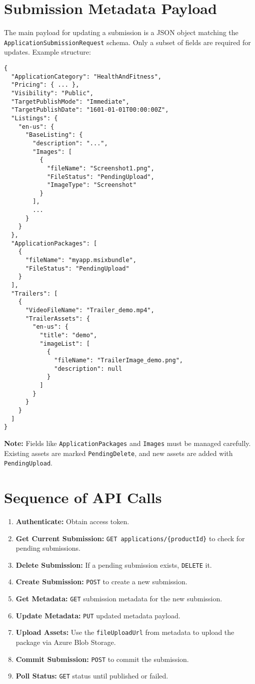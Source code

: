\documentclass{article}
\begin{document}
\section{Submission Metadata Payload}
The main payload for updating a submission is a JSON object matching the \texttt{ApplicationSubmissionRequest} schema. Only a subset of fields are required for updates. Example structure:
\begin{verbatim}
{
  "ApplicationCategory": "HealthAndFitness",
  "Pricing": { ... },
  "Visibility": "Public",
  "TargetPublishMode": "Immediate",
  "TargetPublishDate": "1601-01-01T00:00:00Z",
  "Listings": {
    "en-us": {
      "BaseListing": {
        "description": "...",
        "Images": [
          {
            "fileName": "Screenshot1.png",
            "FileStatus": "PendingUpload",
            "ImageType": "Screenshot"
          }
        ],
        ...
      }
    }
  },
  "ApplicationPackages": [
    {
      "fileName": "myapp.msixbundle",
      "FileStatus": "PendingUpload"
    }
  ],
  "Trailers": [
    {
      "VideoFileName": "Trailer_demo.mp4",
      "TrailerAssets": {
        "en-us": {
          "title": "demo",
          "imageList": [
            {
              "fileName": "TrailerImage_demo.png",
              "description": null
            }
          ]
        }
      }
    }
  ]
}
\end{verbatim}
\textbf{Note:} Fields like \texttt{ApplicationPackages} and \texttt{Images} must be managed carefully. Existing assets are marked \texttt{PendingDelete}, and new assets are added with \texttt{PendingUpload}.

\section{Sequence of API Calls}
\begin{enumerate}
    \item \textbf{Authenticate:} Obtain access token.
    \item \textbf{Get Current Submission:} \texttt{GET applications/\{productId\}} to check for pending submissions.
    \item \textbf{Delete Submission:} If a pending submission exists, \texttt{DELETE} it.
    \item \textbf{Create Submission:} \texttt{POST} to create a new submission.
    \item \textbf{Get Metadata:} \texttt{GET} submission metadata for the new submission.
    \item \textbf{Update Metadata:} \texttt{PUT} updated metadata payload.
    \item \textbf{Upload Assets:} Use the \texttt{fileUploadUrl} from metadata to upload the package via Azure Blob Storage.
    \item \textbf{Commit Submission:} \texttt{POST} to commit the submission.
    \item \textbf{Poll Status:} \texttt{GET} status until published or failed.
\end{enumerate}
\end{document}
